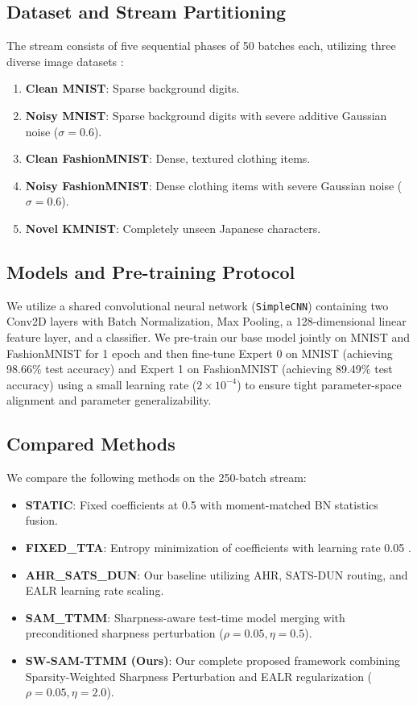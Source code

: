 \documentclass{article}
\theoremstyle{plain}
\theoremstyle{definition}
\theoremstyle{remark}
\begin{document}
\subsection{Dataset and Stream Partitioning}
The stream consists of five sequential phases of 50 batches each, utilizing three diverse image datasets \cite{lecun1998gradient, xiao2017fashion, clanuwat2018deep}:
\begin{enumerate}
  \item \textbf{Clean MNIST}: Sparse background digits.
  \item \textbf{Noisy MNIST}: Sparse background digits with severe additive Gaussian noise ($\sigma = 0.6$).
  \item \textbf{Clean FashionMNIST}: Dense, textured clothing items.
  \item \textbf{Noisy FashionMNIST}: Dense clothing items with severe Gaussian noise ($\sigma = 0.6$).
  \item \textbf{Novel KMNIST}: Completely unseen Japanese characters.
\end{enumerate}

\subsection{Models and Pre-training Protocol}
We utilize a shared convolutional neural network (\texttt{SimpleCNN}) containing two Conv2D layers with Batch Normalization, Max Pooling, a 128-dimensional linear feature layer, and a classifier. We pre-train our base model jointly on MNIST and FashionMNIST for 1 epoch and then fine-tune Expert 0 on MNIST (achieving 98.66\% test accuracy) and Expert 1 on FashionMNIST (achieving 89.49\% test accuracy) using a small learning rate ($2 \times 10^{-4}$) to ensure tight parameter-space alignment and parameter generalizability.

\subsection{Compared Methods}
We compare the following methods on the 250-batch stream:
\begin{itemize}
  \item \textbf{STATIC}: Fixed coefficients at 0.5 with moment-matched BN statistics fusion.
  \item \textbf{FIXED\_TTA}: Entropy minimization of coefficients with learning rate 0.05 \cite{wang2021tent}.
  \item \textbf{AHR\_SATS\_DUN}: Our baseline utilizing AHR, SATS-DUN routing, and EALR learning rate scaling.
  \item \textbf{SAM\_TTMM}: Sharpness-aware test-time model merging with preconditioned sharpness perturbation ($\rho = 0.05, \eta = 0.5$).
  \item \textbf{SW-SAM-TTMM (Ours)}: Our complete proposed framework combining Sparsity-Weighted Sharpness Perturbation and EALR regularization ($\rho = 0.05, \eta = 2.0$).
\end{itemize}
\end{document}
